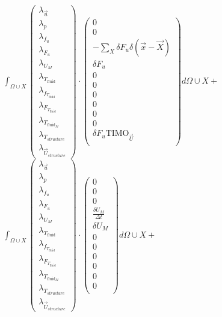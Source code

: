 \documentclass[10pt]{article} %
\begin{document}
\begin{center}
	$\int_{\Omega \cup X}
	\begin{pmatrix}
		\lambda_{\vec{u}} \\ \lambda_p \\ \lambda_{f_u} \\ \lambda_{F_u} \\ \lambda_{U_M}\\ \lambda_{T_{\text{fluid}}} \\ \lambda_{f_{T_{\text{fluid}}}} \\ \lambda_{F_{T_{\text{fluid}}}} \\ \lambda_{T_{\text{fluid}_M}} \\ \lambda_{T_{structure}} \\ \lambda_{\vec{U}_{structure}}
	\end{pmatrix}
	\cdot
	\begin{pmatrix}
		0 \\
		0\\
		-\sum_X \delta F_u \delta (\vec{x}-\vec{X}) \\
		\delta F_u \\
		0 \\
		0 \\
		0\\
		0\\
		0\\
		0\\
		\delta F_u \text{TIMO}_{\vec{U}}\\
	\end{pmatrix}
	d\Omega \cup X + $\\

	$\int_{\Omega \cup X}
	\begin{pmatrix}
		\lambda_{\vec{u}} \\ \lambda_p \\ \lambda_{f_u} \\ \lambda_{F_u} \\ \lambda_{U_M}\\ \lambda_{T_{\text{fluid}}} \\ \lambda_{f_{T_{\text{fluid}}}} \\ \lambda_{F_{T_{\text{fluid}}}} \\ \lambda_{T_{\text{fluid}_M}} \\ \lambda_{T_{structure}} \\ \lambda_{\vec{U}_{structure}}
	\end{pmatrix}
	\cdot
	\begin{pmatrix}
		0 \\
		0\\
		0 \\
		\frac{\delta U_M}{\Delta t} \\
		\delta U_M \\
		0 \\
		0\\
		0\\
		0\\
		0\\
		0\\
	\end{pmatrix}
	d\Omega \cup X + $\\


\end{center}
\end{document}

